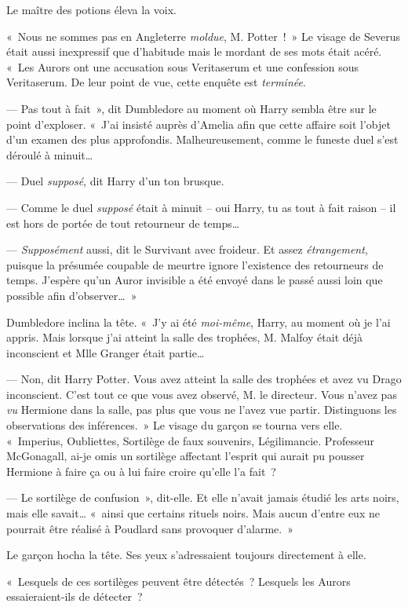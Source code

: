 Le maître des potions éleva la voix.

«~Nous ne sommes pas en Angleterre \emph{moldue}, M. Potter~!~» Le visage de Severus était aussi inexpressif que d'habitude mais le mordant de ses mots était acéré. «~Les Aurors ont une accusation sous Veritaserum et une confession sous Veritaserum. De leur point de vue, cette enquête est \emph{terminée}.

--- Pas tout à fait~», dit Dumbledore au moment où Harry sembla être sur le point d'exploser. «~J'ai insisté auprès d'Amelia afin que cette affaire soit l'objet d'un examen des plus approfondis. Malheureusement, comme le funeste duel s'est déroulé à minuit…

--- Duel \emph{supposé}, dit Harry d'un ton brusque.

--- Comme le duel \emph{supposé} était à minuit -- oui Harry, tu as tout à fait raison -- il est hors de portée de tout retourneur de temps…

--- \emph{Supposément} aussi, dit le Survivant avec froideur. Et assez \emph{étrangement}, puisque la présumée coupable de meurtre ignore l'existence des retourneurs de temps. J'espère qu'un Auror invisible a été envoyé dans le passé aussi loin que possible afin d'observer…~»

Dumbledore inclina la tête. «~J'y ai été \emph{moi-même}, Harry, au moment où je l'ai appris. Mais lorsque j'ai atteint la salle des trophées, M. Malfoy était déjà inconscient et Mlle Granger était partie…

--- Non, dit Harry Potter. Vous avez atteint la salle des trophées et avez vu Drago inconscient. C'est tout ce que vous avez observé, M. le directeur. Vous n'avez pas \emph{vu} Hermione dans la salle, pas plus que vous ne l'avez vue partir. Distinguons les observations des inférences.~» Le visage du garçon se tourna vers elle. «~Imperius, Oubliettes, Sortilège de faux souvenirs, Légilimancie. Professeur McGonagall, ai-je omis un sortilège affectant l'esprit qui aurait pu pousser Hermione à faire ça ou à lui faire croire qu'elle l'a fait~?

--- Le sortilège de confusion~», dit-elle. Et elle n'avait jamais étudié les arts noirs, mais elle savait… «~ainsi que certains rituels noirs. Mais aucun d'entre eux ne pourrait être réalisé à Poudlard sans provoquer d'alarme.~»

Le garçon hocha la tête. Ses yeux s'adressaient toujours directement à elle.

«~Lesquels de ces sortilèges peuvent être détectés~? Lesquels les Aurors essaieraient-ils de détecter~?

